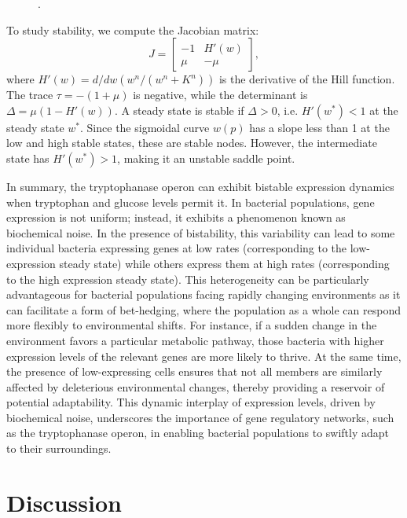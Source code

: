 \begin{figure}[h]
\centering
\caption{.}
\label{fig:27.01}
\end{figure}

To study stability, we compute the Jacobian matrix:
\begin{equation*}
J =
\begin{bmatrix}
-1 & H'\left(w\right) \\
\mu & -\mu
\end{bmatrix},
\end{equation*}
where $H'(w) = d/dw \left(w^n/(w^n+K^n)\right)$ is the derivative of the Hill function. The trace $\tau = -(1+\mu)$ is negative, while the determinant is $\Delta = \mu(1-H'(w))$. A steady state is stable if $\Delta > 0$, i.e. $H'(w^*) < 1$ at the steady state $w^*$.  Since the sigmoidal curve $w(p)$ has a slope less than 1 at the low and high stable states, these are stable nodes. However, the intermediate state has $H'(w^*)>1$, making it an unstable saddle point.

In summary, the tryptophanase operon can exhibit bistable expression dynamics when tryptophan and glucose levels permit it. In bacterial populations, gene expression is not uniform; instead, it exhibits a phenomenon known as biochemical noise. In the presence of bistability, this variability can lead to some individual bacteria expressing genes at low rates (corresponding to the low-expression steady state) while others express them at high rates (corresponding to the high expression steady state). This heterogeneity can be particularly advantageous for bacterial populations facing rapidly changing environments as it can facilitate a form of bet-hedging, where the population as a whole can respond more flexibly to environmental shifts. For instance, if a sudden change in the environment favors a particular metabolic pathway, those bacteria with higher expression levels of the relevant genes are more likely to thrive. At the same time, the presence of low-expressing cells ensures that not all members are similarly affected by deleterious environmental changes, thereby providing a reservoir of potential adaptability. This dynamic interplay of expression levels, driven by biochemical noise, underscores the importance of gene regulatory networks, such as the tryptophanase operon, in enabling bacterial populations to swiftly adapt to their surroundings.

\section{Discussion}


